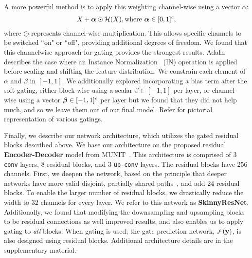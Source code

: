 A more powerful method is to apply this weighting channel-wise using a vector {\boldmath$\alpha$}: %
\begin{align}
	X + \mbox{\boldmath $\alpha$} \odot \mathcal{H}(X), \text{where } \mbox{\boldmath $\alpha$} \in [0,1]^c, 
\end{align}
where $\odot$ represents channel-wise multiplication. This allows specific channels to be switched ``on" or ``off", providing additional degrees of freedom.
We found that this channelwise approach for gating provides the strongest results. 
AdaIn describes the case where an Instance Normalization~\cite{ulyanovinstance} (IN) operation is applied before scaling and shifting the feature distribution.
We constrain each element of {\boldmath $\alpha$} and {\boldmath $\beta$} in $[-1, 1]$.
We additionally explored incorporating a bias term after the soft-gating, either block-wise using a scalar $\beta \in [-1,1]$ per layer, or channel-wise using a vector $\mbox{\boldmath $\beta$} \in [-1, 1]^c$ per layer but we found that they did not help much, and so we leave them out of our final model. Refer  for pictorial representation of various gatings.


Finally, we describe our network architecture, which utilizes the gated residual blocks described above.
We base our architecture on the proposed residual \textbf{Encoder-Decoder} model from MUNIT~\cite{huang2018multimodal}.
This architecture is comprised of 3 \texttt{conv} layers, 8 residual blocks, and 3 \texttt{up-conv} layers. The residual blocks have 256 channels. 
First, we deepen the network, based on the principle that deeper networks have more valid disjoint, partially shared paths~\cite{veit2016residual}, and add 24 residual blocks. 
To enable the larger number of residual blocks, we drastically reduce the width to 32 channels for every layer. 
We refer to this network as \textbf{SkinnyResNet}. 
Additionally, we found that modifying the downsampling and upsampling blocks to be residual connections as well improved results, and also enables us to apply gating to {\em all} blocks. 
When gating is used, the gate prediction network, $\mathcal{F} ({\bf y})$,  
is also designed using residual blocks. Additional architecture details are in the supplementary material. 


